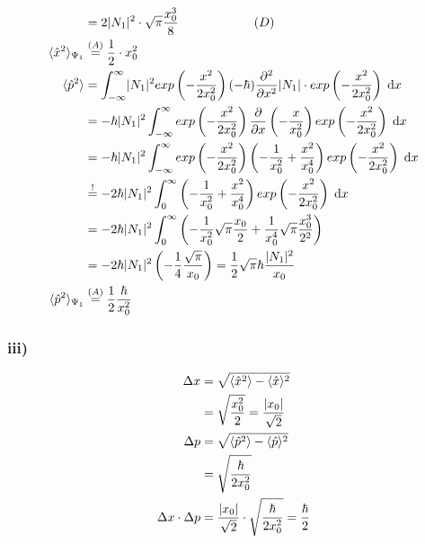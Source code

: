 \begin{align}
        &= 2 \lvert N_1\rvert^2 \cdot \sqrt{\pi} \frac{x_0^3}{8} \qquad \qquad \qquad (D)\\
        \langle \hat{x}^2 \rangle_{\Psi_1} &\stackrel{(A)}{=} \frac{1}{2} \cdot x_0^2\\
        \langle \hat{p}^2 \rangle &= \int_{-\infty}^{\infty} \lvert N_1\rvert^2 exp \left(- \frac{x^2}{2x_0^2} \right) (-\hbar) \frac{\partial ^2}{\partial x^2} 
        \lvert N_1\rvert \cdot exp \left(- \frac{x^2}{2x_0^2} \right) \; \mathrm{d}x\\
        &= - \hbar \lvert N_1\rvert^2 \int_{-\infty}^{\infty} exp \left(- \frac{x^2}{2x_0^2} \right) \frac{\partial}{\partial x} \left( -\frac{x}{x_0^2} 
        \right) exp \left(- \frac{x^2}{2x_0^2} \right) \; \mathrm{d}x \nonumber\\
        &= - \hbar \lvert N_1\rvert^2 \int_{-\infty}^{\infty} exp \left(- \frac{x^2}{2x_0^2} \right) \left( -\frac{1}{x_0^2} + \frac{x^2}{x_0^4} \right) 
        exp \left(- \frac{x^2}{2x_0^2} \right) \; \mathrm{d}x \nonumber\\
        &\stackrel{!}{=} -2 \hbar \lvert N_1\rvert^2 \int_{0}^{\infty} \left( -\frac{1}{x_0^2} + \frac{x^2}{x_0^4} \right) exp \left(- \frac{x^2}{2x_0^2}
        \right) \; \mathrm{d}x \nonumber\\
        &= -2 \hbar \lvert N_1\rvert^2 \int_{0}^{\infty} \left( -\frac{1}{x_0^2} \sqrt{\pi} \frac{x_0}{2} + \frac{1}{x_0^4} \sqrt{\pi} \frac{x_0^3}{2^2}
        \right) \nonumber\\
        &= -2 \hbar \lvert N_1\rvert^2 \left( -\frac{1}{4} \frac{\sqrt{\pi}}{x_0} \right) = \frac{1}{2} \sqrt{\pi} \hbar \frac{\lvert N_1\rvert^2}{x_0} \nonumber\\
        \langle \hat{p}^2 \rangle_{\Psi_1} &\stackrel{(A)}{=} \frac{1}{2} \frac{\hbar}{x_0^2}
    \end{align}

\subsubsection{iii)}

    \begin{align}
        \Delta x &= \sqrt{\langle \hat{x}^2 \rangle - \langle \hat{x} \rangle^2}\\
        &= \sqrt{\frac{x_0^2}{2}} = \frac{\lvert x_0\rvert}{\sqrt{2}}\\
        \Delta p &= \sqrt{\langle \hat{p}^2 \rangle - \langle \hat{p} \rangle^2}\\
        &= \sqrt{\frac{\hbar}{2 x_0^2}}\\
        \Delta x \cdot \Delta p &= \frac{\lvert x_0\rvert}{\sqrt{2}} \cdot \sqrt{\frac{\hbar}{2 x_0^2}}
        = \frac{\hbar}{2}
    \end{align}

